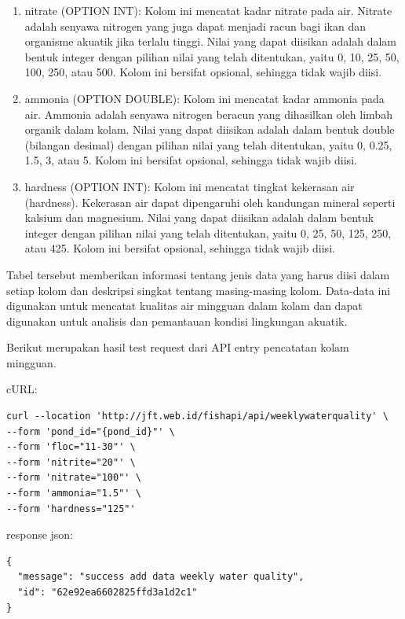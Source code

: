 \begin{enumerate}[1.]
\begin{enumerate}
\item nitrate (OPTION INT): Kolom ini mencatat kadar nitrate pada air. Nitrate adalah senyawa nitrogen yang juga dapat menjadi racun bagi ikan dan organisme akuatik jika terlalu tinggi. Nilai yang dapat diisikan adalah dalam bentuk integer dengan pilihan nilai yang telah ditentukan, yaitu 0, 10, 25, 50, 100, 250, atau 500. Kolom ini bersifat opsional, sehingga tidak wajib diisi.

\item ammonia (OPTION DOUBLE): Kolom ini mencatat kadar ammonia pada air. Ammonia adalah senyawa nitrogen beracun yang dihasilkan oleh limbah organik dalam kolam. Nilai yang dapat diisikan adalah dalam bentuk double (bilangan desimal) dengan pilihan nilai yang telah ditentukan, yaitu 0, 0.25, 1.5, 3, atau 5. Kolom ini bersifat opsional, sehingga tidak wajib diisi.

\item hardness (OPTION INT): Kolom ini mencatat tingkat kekerasan air (hardness). Kekerasan air dapat dipengaruhi oleh kandungan mineral seperti kalsium dan magnesium. Nilai yang dapat diisikan adalah dalam bentuk integer dengan pilihan nilai yang telah ditentukan, yaitu 0, 25, 50, 125, 250, atau 425. Kolom ini bersifat opsional, sehingga tidak wajib diisi.
\end{enumerate}

Tabel tersebut memberikan informasi tentang jenis data yang harus diisi dalam setiap kolom dan deskripsi singkat tentang masing-masing kolom. Data-data ini digunakan untuk mencatat kualitas air mingguan dalam kolam dan dapat digunakan untuk analisis dan pemantauan kondisi lingkungan akuatik.


Berikut merupakan hasil test request dari API entry pencatatan kolam mingguan.

cURL:

\begin{lstlisting}
curl --location 'http://jft.web.id/fishapi/api/weeklywaterquality' \
--form 'pond_id="{pond_id}"' \
--form 'floc="11-30"' \
--form 'nitrite="20"' \
--form 'nitrate="100"' \
--form 'ammonia="1.5"' \
--form 'hardness="125"'
\end{lstlisting}

response json:

\begin{lstlisting}
{
  "message": "success add data weekly water quality",
  "id": "62e92ea6602825ffd3a1d2c1"
}
\end{lstlisting}





\end{enumerate}
